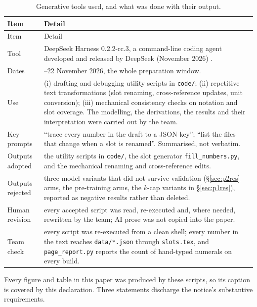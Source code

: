 \documentclass{swmcmthesis}
\begin{document}
\begin{appendices}
\begin{longtable}{@{}>{\raggedright\arraybackslash}p{}>{\raggedright\arraybackslash}p{}@{}}
\caption{Generative tools used, and what was done with their output.}
\label{tab:aitools}\\
\toprule
Item & Detail \\
\midrule
\endfirsthead
\toprule
Item & Detail \\
\midrule
\endhead
\bottomrule
\endfoot
Tool & DeepSeek Harness 0.2.2-rc.3, a command-line coding agent developed and released by DeepSeek (November 2026) \cite{deepseek}. \\
Dates & 18--22 November 2026, the whole preparation window. \\
Use & (i) drafting and debugging utility scripts in \texttt{code/};
(ii) repetitive text transformations (slot renaming, cross-reference updates,
unit conversion);
(iii) mechanical consistency checks on notation and slot coverage.
The modelling, the derivations, the results and their interpretation were
carried out by the team. \\
Key prompts & ``trace every number in the draft to a JSON key''; ``list the
files that change when a slot is renamed''. Summarised, not verbatim. \\
Outputs adopted & the utility scripts in \texttt{code/}, the slot generator
\texttt{fill\_numbers.py}, and the mechanical renaming and cross-reference edits. \\
Outputs rejected & three model variants that did not survive validation
(\S\ref{sec:p2res} arms, the pre-training arms, the $k$-cap variants in
\S\ref{sec:p1res}), reported as negative results rather than deleted. \\
Human revision & every accepted script was read, re-executed and, where needed, rewritten by the team; AI prose was not copied into the paper. \\
Team check & every script was re-executed from a clean shell; every number in the
text reaches \texttt{data/*.json} through \texttt{slots.tex}, and
\texttt{page\_report.py} reports the count of hand-typed numerals on every
build. \\
\end{longtable}

Every figure and table in this paper was produced by these scripts, so its caption is covered by this declaration. Three statements discharge the notice's substantive requirements.


\end{appendices}
\end{document}
